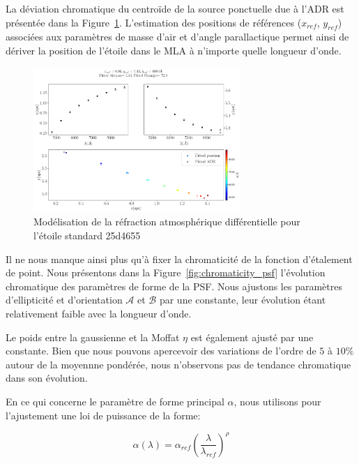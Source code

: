 \documentclass[../main/main.tex]{subfiles}
\begin{document}
La déviation chromatique du centroïde de la source ponctuelle due à
l'ADR est présentée dans la Figure~\ref{fig:adr_std}. L'estimation des
positions de références ($x_{ref}$, $y_{ref}$) associées aux 
paramètres de masse d'air et d'angle parallactique permet ainsi de
dériver la position de l'étoile dans le MLA à n'importe quelle longueur d'onde.

\begin{figure}
  \centering
  \includegraphics[width=0.7\textwidth]{../figures/06_irf/adr_std.pdf}
  \caption[Modélisation de la réfraction atmosphérique
  différentielle]{Modélisation de la réfraction atmosphérique
    différentielle pour l'étoile standard 25d4655}
  \label{fig:adr_std}
\end{figure}

Il ne nous manque ainsi plus qu'à fixer la chromaticité de la fonction
d'étalement de point.
Nous présentons dans la Figure~\ref{fig:chromaticity_psf} l'évolution
chromatique des paramètres de forme de la PSF. Nous ajustons les
paramètres d'ellipticité et d'orientation $\mathcal{A}$ et $\mathcal{B}$
par une constante, leur évolution étant relativement faible avec la longueur d'onde.

Le poids entre la gaussienne et la Moffat $\eta$ est également ajusté
par une constante. Bien que nous pouvons apercevoir des variations de
l'ordre de $5$ à $10\%$ autour de la moyennne pondérée, nous n'observons pas
de tendance chromatique dans son évolution.

En ce qui concerne le paramètre de forme principal $\alpha$, nous
utilisons pour l'ajustement une loi de puissance de la forme:

\begin{equation}
  \label{eq:alphachrom}
  \alpha(\lambda)=\alpha_{ref}\left(\frac{\lambda}{\lambda_{ref}}\right)^{\rho}
\end{equation}
\end{document}
